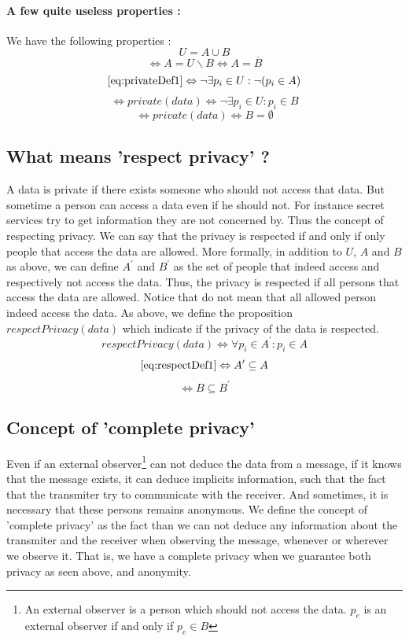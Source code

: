 \documentclass[a4paper, onecolumn, 10pt]{article}
\numberwithin{equation}{section}
\begin{document}
\paragraph{A few quite useless properties :}
We have the following properties :
$$U=A\cup B$$
$$\Leftrightarrow A=U\backslash B\Leftrightarrow A=\overline{B}$$
$$\eqref{eq:privateDef1}\Leftrightarrow\neg\exists p_i \in U:\neg(p_i \in A)$$
\begin{equation}
  \Leftrightarrow \boxed{private(data)\Leftrightarrow\neg\exists p_i \in U:p_i\in B}
\end{equation}
\begin{equation}
  \Leftrightarrow \boxed{private(data)\Leftrightarrow B=\emptyset}
\end{equation}
\subsection{What means 'respect privacy' ?}
A data is private if there exists someone who should not access that data. But sometime a person can access a data even if he should not. For instance secret services try to get information they are not concerned by. Thus the concept of respecting privacy. We can say that the privacy is respected if and only if only people that access the data are allowed. More formally, in addition to $U$, $A$ and $B$ as above, we can define $A^\prime$ and $B^\prime$ as the set of people that indeed access and respectively not access the data. Thus, the privacy is respected if all persons that access the data are allowed. Notice that do not mean that all allowed person indeed access the data. As above, we define the proposition $respectPrivacy(data)$ which indicate if the privacy of the data is respected.
\begin{equation} \label{eq:respectDef1}
  \boxed{respectPrivacy(data)\Leftrightarrow\forall p_i\in A^\prime:p_i\in A}
\end{equation}
$$\eqref{eq:respectDef1}\Leftrightarrow A^\prime\subseteq A$$
\begin{equation} \label{eq:respectDef2}
  \boxed{\Leftrightarrow B\subseteq B^\prime}
\end{equation}
\subsection{Concept of 'complete privacy'}
Even if an external observer\footnote{An external observer is a person which should not access the data. $p_e$ is an external observer if and only if $p_e \in B$} can not deduce the data from a message, if it knows that the message exists, it can deduce implicits information, such that the fact that the transmiter try to communicate with the receiver. And sometimes, it is necessary that these persons remains anonymous. We define the concept of 'complete privacy' as the fact than we can not deduce any information about the transmiter and the receiver when observing the message, whenever or wherever we observe it. That is, we have a complete privacy when we guarantee both privacy as seen above, and anonymity.
\end{document}
